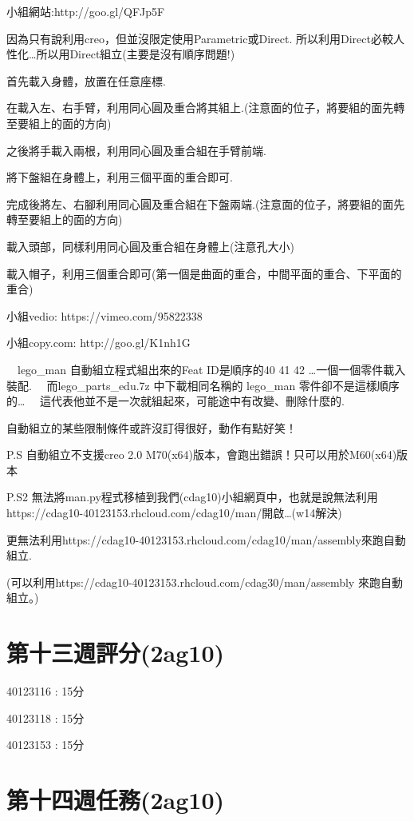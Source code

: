 \documentclass[]{article}
\begin{document}
小組網站:http://goo.gl/QFJp5F

因為只有說利用creo，但並沒限定使用Parametric或Direct.
所以利用Direct必較人性化\ldots{}所以用Direct組立(主要是沒有順序問題!)

首先載入身體，放置在任意座標.

在載入左、右手臂，利用同心圓及重合將其組上.(注意面的位子，將要組的面先轉至要組上的面的方向)

之後將手載入兩根，利用同心圓及重合組在手臂前端.

將下盤組在身體上，利用三個平面的重合即可.

完成後將左、右腳利用同心圓及重合組在下盤兩端.(注意面的位子，將要組的面先轉至要組上的面的方向)

載入頭部，同樣利用同心圓及重合組在身體上(注意孔大小)

載入帽子，利用三個重合即可(第一個是曲面的重合，中間平面的重合、下平面的重合)

小組vedio: https://vimeo.com/95822338

小組copy.com: http://goo.gl/K1nh1G

　lego\_man 自動組立程式組出來的Feat ID是順序的40 41 42
\ldots{}一個一個零件載入裝配. 　而lego\_parts\_edu.7z 中下載相同名稱的
lego\_man 零件卻不是這樣順序的\ldots{}
　這代表他並不是一次就組起來，可能途中有改變、刪除什麼的.

自動組立的某些限制條件或許沒訂得很好，動作有點好笑！

P.S 自動組立不支援creo 2.0
M70(x64)版本，會跑出錯誤！只可以用於M60(x64)版本

P.S2 無法將man.py程式移植到我們(cdag10)小組網頁中，也就是說無法利用
https://cdag10-40123153.rhcloud.com/cdag10/man/開啟\ldots{}(w14解決)

更無法利用https://cdag10-40123153.rhcloud.com/cdag10/man/assembly來跑自動組立.

(可以利用https://cdag10-40123153.rhcloud.com/cdag30/man/assembly
來跑自動組立。)

\section{第十三週評分(2ag10)}\label{ux7b2cux5341ux4e09ux9031ux8a55ux52062ag10}

40123116 : 15分

40123118 : 15分

40123153 : 15分

\section{第十四週任務(2ag10)}\label{ux7b2cux5341ux56dbux9031ux4efbux52d92ag10}
\end{document}

